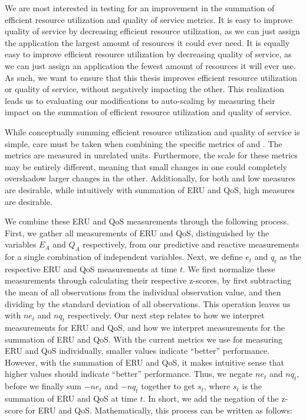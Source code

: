 We are most interested in testing for an improvement in the summation of
efficient resource utilization and quality of service metrics. It is
easy to improve quality of service by decreasing efficient resource
utilization, as we can just assign the application the largest amount of
resources it could ever need. It is equally easy to improve efficient resource
utilization by decreasing quality of service, as we can just assign an
application the fewest amount of resources it will ever use. As such, we want to
ensure that this thesis improves efficient resource utilization or quality of
service, without negatively impacting the other. This realization leads us to
evaluating our modifications to auto-scaling by measuring their impact on the
summation of efficient resource utilization and quality of service.

While conceptually summing efficient resource utilization and quality of service
is simple, care must be taken when combining the specific metrics of
 and . The metrics are measured in unrelated
units. Furthermore, the scale for these metrics may be entirely different,
meaning that small changes in one could completely overshadow larger changes in
the other. Additionally, for both  and  low
measures are desirable, while intuitively with summation of ERU and QoS, high
measures are desirable.

We combine these ERU and QoS measurements through the following process.
First, we gather all measurements of ERU and QoS,
distinguished by the variables $E_{A}$ and $Q_{A}$ respectively, from our
predictive and reactive measurements for a single combination of independent
variables. Next, we define $e_{t}$ and $q_{t}$ as the
respective ERU and QoS measurements at time $t$. We first
normalize these measurements through calculating their respective z-scores,
by first subtracting the mean of all observations from the individual observation value,
and then dividing by the standard deviation of all
observations. This operation leaves us with $ne_{t}$ and $nq_{t}$ respectively.
Our next step relates to how we interpret measurements for ERU and QoS, and how
we interpret measurements for the summation of ERU and QoS. With the current
metrics we use for measuring ERU and QoS individually, smaller values indicate
``better'' performance. However, with the summation of ERU and QoS, it makes
intuitive sense that higher values should indicate ``better'' performance.
Thus, we negate $ne_{t}$ and $nq_{t}$, before we finally sum
$-ne_{t}$ and $-nq_{t}$ together to get $s_{t}$, where $s_{t}$ is the summation
of ERU and QoS at time $t$.
In short, we add the negation of the z-score for
ERU and QoS. Mathematically, this process can be written as
follows:

